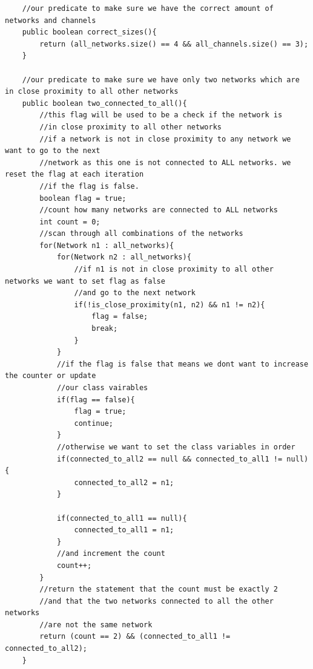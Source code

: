 \documentclass{article}
\begin{document}
\begin{lstlisting}
    //our predicate to make sure we have the correct amount of networks and channels
    public boolean correct_sizes(){
        return (all_networks.size() == 4 && all_channels.size() == 3);
    }

    //our predicate to make sure we have only two networks which are in close proximity to all other networks
    public boolean two_connected_to_all(){
        //this flag will be used to be a check if the network is
        //in close proximity to all other networks
        //if a network is not in close proximity to any network we want to go to the next
        //network as this one is not connected to ALL networks. we reset the flag at each iteration
        //if the flag is false.
        boolean flag = true;
        //count how many networks are connected to ALL networks
        int count = 0;
        //scan through all combinations of the networks
        for(Network n1 : all_networks){
            for(Network n2 : all_networks){
                //if n1 is not in close proximity to all other networks we want to set flag as false
                //and go to the next network
                if(!is_close_proximity(n1, n2) && n1 != n2){
                    flag = false;
                    break;
                }
            }
            //if the flag is false that means we dont want to increase the counter or update
            //our class vairables
            if(flag == false){
                flag = true;
                continue;
            }
            //otherwise we want to set the class variables in order
            if(connected_to_all2 == null && connected_to_all1 != null){
                connected_to_all2 = n1;
            }

            if(connected_to_all1 == null){
                connected_to_all1 = n1;
            }
            //and increment the count
            count++;
        }
        //return the statement that the count must be exactly 2
        //and that the two networks connected to all the other networks
        //are not the same network
        return (count == 2) && (connected_to_all1 != connected_to_all2);
    }


\end{lstlisting}
\end{document}

